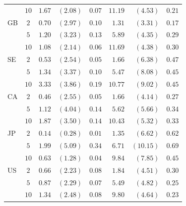 \begin{tabular}{l c rrc rrc}
     & $10$ & $1.67$ & $(2.08)$ & $0.07$ & $11.19$ & $(4.53)$  & $0.21$ \\
  \addlinespace
  GB & $2$  & $0.70$ & $(2.97)$ & $0.10$ & $1.31$  & $(3.31)$  & $0.17$ \\
     & $5$  & $1.20$ & $(3.23)$ & $0.13$ & $5.89$  & $(4.35)$  & $0.29$ \\
     & $10$ & $1.08$ & $(2.14)$ & $0.06$ & $11.69$ & $(4.38)$  & $0.30$ \\
  \addlinespace
  SE & $2$  & $0.53$ & $(2.54)$ & $0.05$ & $1.66$  & $(6.38)$  & $0.47$ \\
     & $5$  & $1.34$ & $(3.37)$ & $0.10$ & $5.47$  & $(8.08)$  & $0.45$ \\
     & $10$ & $3.33$ & $(3.86)$ & $0.19$ & $10.77$ & $(9.02)$  & $0.45$ \\
  \addlinespace
  CA & $2$  & $0.46$ & $(2.55)$ & $0.05$ & $1.66$  & $(4.14)$  & $0.27$ \\
     & $5$  & $1.12$ & $(4.04)$ & $0.14$ & $5.62$  & $(5.66)$  & $0.34$ \\
     & $10$ & $1.87$ & $(3.50)$ & $0.14$ & $10.43$ & $(5.32)$  & $0.33$ \\
  \addlinespace
  JP & $2$  & $0.14$ & $(0.28)$ & $0.01$ & $1.35$  & $(6.62)$  & $0.62$ \\
     & $5$  & $1.99$ & $(5.09)$ & $0.34$ & $6.71$  & $(10.15)$ & $0.69$ \\
     & $10$ & $0.63$ & $(1.28)$ & $0.04$ & $9.84$  & $(7.85)$  & $0.45$ \\
  \addlinespace
  US & $2$  & $0.66$ & $(2.23)$ & $0.08$ & $1.84$  & $(4.51)$  & $0.30$ \\
     & $5$  & $0.87$ & $(2.29)$ & $0.07$ & $5.49$  & $(4.82)$  & $0.25$ \\
     & $10$ & $1.34$ & $(2.48)$ & $0.08$ & $9.80$  & $(4.64)$  & $0.23$ \\
  \bottomrule
\end{tabular}
